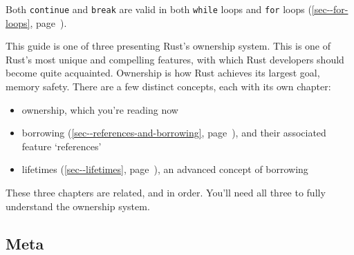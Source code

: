 \documentclass[a4paper,]{book}
\renewcommand*{\hyperref}[2][\ar]{%
  \def\ar{#2}%
  #2 (\autoref{#1}, page~\pageref{#1})}
\newenvironment{Shaded}{\begin{snugshade}}{\end{snugshade}}
\newcommand{\KeywordTok}[1]{\textcolor[rgb]{0.13,0.29,0.53}{\textbf{{#1}}}}
\newcommand{\DecValTok}[1]{\textcolor[rgb]{0.00,0.00,0.81}{{#1}}}
\newcommand{\StringTok}[1]{\textcolor[rgb]{0.31,0.60,0.02}{{#1}}}
\newcommand{\CommentTok}[1]{\textcolor[rgb]{0.56,0.35,0.01}{\textit{{#1}}}}
\newcommand{\OtherTok}[1]{\textcolor[rgb]{0.56,0.35,0.01}{{#1}}}
\newcommand{\PreprocessorTok}[1]{\textcolor[rgb]{0.56,0.35,0.01}{\textit{{#1}}}}
\newcommand{\NormalTok}[1]{{#1}}
\providecommand{\tightlist}{%
  \setlength{\itemsep}{0pt}\setlength{\parskip}{0pt}}
\begin{document}
\begin{Shaded}
\end{Shaded}

Both \texttt{continue} and \texttt{break} are valid in both
\texttt{while} loops and \hyperref[sec--for-loops]{\texttt{for} loops}.


This guide is one of three presenting Rust's ownership system. This is
one of Rust's most unique and compelling features, with which Rust
developers should become quite acquainted. Ownership is how Rust
achieves its largest goal, memory safety. There are a few distinct
concepts, each with its own chapter:

\begin{itemize}
\tightlist
\item
  ownership, which you're reading now
\item
  \hyperref[sec--references-and-borrowing]{borrowing}, and their
  associated feature `references'
\item
  \hyperref[sec--lifetimes]{lifetimes}, an advanced concept of borrowing
\end{itemize}

These three chapters are related, and in order. You'll need all three to
fully understand the ownership system.

\subsection{Meta}\label{meta}
\end{document}
